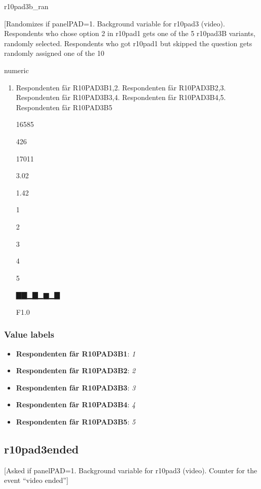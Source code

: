 \documentclass[]{book}
\providecommand{\tightlist}{%
  \setlength{\itemsep}{0pt}\setlength{\parskip}{0pt}}
\begin{document}
r10pad3b\_ran

{[}Randomizes if panelPAD=1. Background variable for r10pad3 (video).
Respondents who chose option 2 in r10pad1 gets one of the 5 r10pad3B
variants, randomly selected. Respondents who got r10pad1 but skipped the
question gets randomly assigned one of the 10

numeric

\begin{enumerate}
\def\labelenumi{\arabic{enumi}.}
\tightlist
\item
  Respondenten får R10PAD3B1,2. Respondenten får R10PAD3B2,3.
  Respondenten får R10PAD3B3,4. Respondenten får R10PAD3B4,5.
  Respondenten får R10PAD3B5

  16585

  426

  17011

  3.02

  1.42

  1

  2

  3

  4

  5

  ▇▇▁▇▁▆▁▇

  F1.0
\end{enumerate}

\subsubsection{Value labels}\label{r10pad3b_ran_labels}

\begin{itemize}
\tightlist
\item
  \textbf{Respondenten får R10PAD3B1}: \emph{1}
\item
  \textbf{Respondenten får R10PAD3B2}: \emph{2}
\item
  \textbf{Respondenten får R10PAD3B3}: \emph{3}
\item
  \textbf{Respondenten får R10PAD3B4}: \emph{4}
\item
  \textbf{Respondenten får R10PAD3B5}: \emph{5}
\end{itemize}

\subsection{r10pad3ended}\label{r10pad3ended}

{[}Asked if panelPAD=1. Background variable for r10pad3 (video). Counter
for the event ``video ended''{]}
\end{document}
